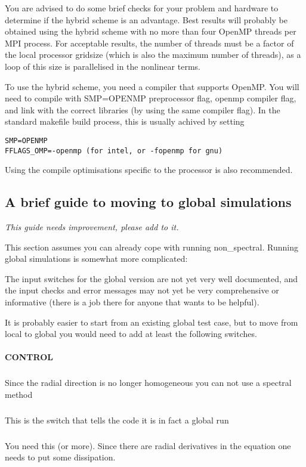 You are advised to do some brief checks for your problem and hardware to determine
if the hybrid scheme is an advantage.  Best results will probably be obtained using the hybrid scheme 
with no more than four OpenMP threads per MPI process.
 For acceptable results, the number of threads must be a factor of the local processor gridsize 
  (which is also the maximum number of threads), as a loop of this size is parallelised in the nonlinear terms.

To use the hybrid scheme, you need a compiler that supports OpenMP.  You will need to compile with
SMP=OPENMP preprocessor flag, openmp compiler flag, and link with the correct libraries (by using the same compiler flag). 
In the standard makefile build process, this is usually achived by setting 
\begin{verbatim}
SMP=OPENMP
FFLAGS_OMP=-openmp (for intel, or -fopenmp for gnu)
\end{verbatim}
Using the compile optimisations specific to the processor is also recommended.

\subsection{A brief guide to moving to global simulations}
\label{sec:brief-guide-moving}

\emph{This guide needs improvement, please add to it.}

This section assumes you can already cope with running non_spectral.
Running global simulations is somewhat more complicated:

The input switches for the global version are not yet very well
documented, and the input checks and error messages may not yet be
very comprehensive or informative (there is a job there for anyone 
that wants to be helpful).  

It is probably easier to start from an existing global test case, 
but to move from local to global you would need to add at least 
the following switches.

\paragraph{CONTROL}
\subparagraph{}
Since the radial direction is no longer 
homogeneous you can not use a spectral 
method 
\subparagraph{}
This is the switch that tells the code 
it is in fact a global run 
\subparagraph{}
You need this (or more). Since there 
are radial derivatives in the equation 
one needs to put some dissipation. 

